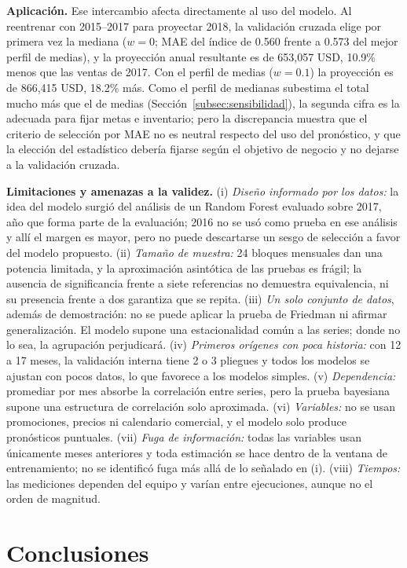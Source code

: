 \documentclass[pdflatex,sn-mathphys-num]{sn-jnl}
\begin{document}
\textbf{Aplicación.} Ese intercambio afecta directamente al uso del modelo. Al reentrenar con 2015--2017 para proyectar 2018, la validación cruzada elige por primera vez la mediana ($w=0$; MAE del índice de 0.560 frente a 0.573 del mejor perfil de medias), y la proyección anual resultante es de 653{,}057 USD, 10.9\% menos que las ventas de 2017. Con el perfil de medias ($w=0.1$) la proyección es de 866{,}415 USD, 18.2\% más. Como el perfil de medianas subestima el total mucho más que el de medias (Sección~\ref{subsec:sensibilidad}), la segunda cifra es la adecuada para fijar metas e inventario; pero la discrepancia muestra que el criterio de selección por MAE no es neutral respecto del uso del pronóstico, y que la elección del estadístico debería fijarse según el objetivo de negocio y no dejarse a la validación cruzada.

\textbf{Limitaciones y amenazas a la validez.} (i) \emph{Diseño informado por los datos:} la idea del modelo surgió del análisis de un Random Forest evaluado sobre 2017, año que forma parte de la evaluación; 2016 no se usó como prueba en ese análisis y allí el margen es mayor, pero no puede descartarse un sesgo de selección a favor del modelo propuesto. (ii) \emph{Tamaño de muestra:} 24 bloques mensuales dan una potencia limitada, y la aproximación asintótica de las pruebas es frágil; la ausencia de significancia frente a siete referencias no demuestra equivalencia, ni su presencia frente a dos garantiza que se repita. (iii) \emph{Un solo conjunto de datos}, además de demostración: no se puede aplicar la prueba de Friedman ni afirmar generalización. El modelo supone una estacionalidad común a las series; donde no lo sea, la agrupación perjudicará. (iv) \emph{Primeros orígenes con poca historia:} con 12 a 17 meses, la validación interna tiene 2 o 3 pliegues y todos los modelos se ajustan con pocos datos, lo que favorece a los modelos simples. (v) \emph{Dependencia:} promediar por mes absorbe la correlación entre series, pero la prueba bayesiana supone una estructura de correlación solo aproximada. (vi) \emph{Variables:} no se usan promociones, precios ni calendario comercial, y el modelo solo produce pronósticos puntuales. (vii) \emph{Fuga de información:} todas las variables usan únicamente meses anteriores y toda estimación se hace dentro de la ventana de entrenamiento; no se identificó fuga más allá de lo señalado en (i). (viii) \emph{Tiempos:} las mediciones dependen del equipo y varían entre ejecuciones, aunque no el orden de magnitud.

\section{Conclusiones}\label{sec:conclusiones}
\end{document}

